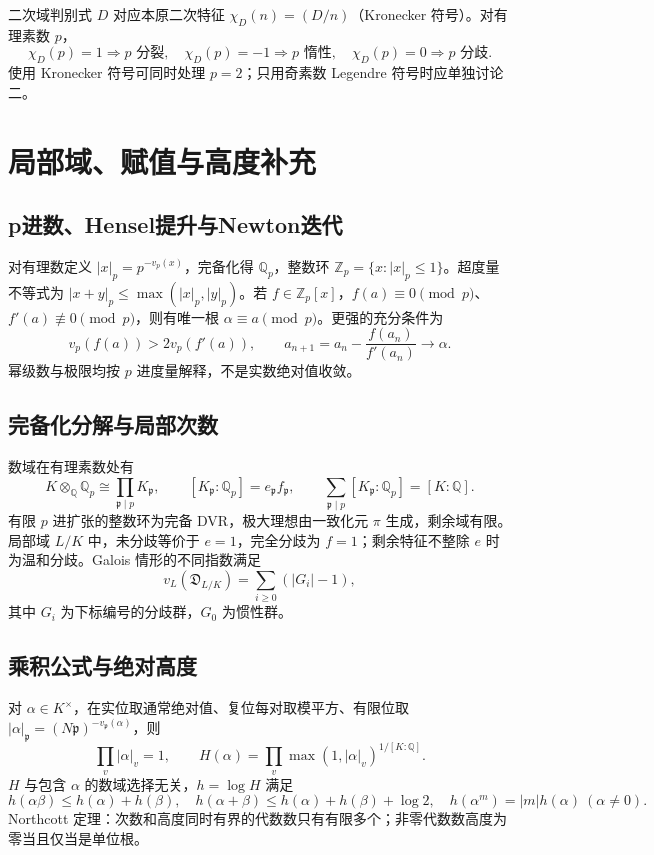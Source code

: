 \documentclass[../main.tex]{subfiles}
\begin{document}
二次域判别式 $D$ 对应本原二次特征 $\chi_D(n)=(D/n)$（Kronecker 符号）。对有理素数 $p$，
\[
\chi_D(p)=1\Rightarrow p\text{ 分裂},\quad
\chi_D(p)=-1\Rightarrow p\text{ 惰性},\quad
\chi_D(p)=0\Rightarrow p\text{ 分歧}.
\]
使用 Kronecker 符号可同时处理 $p=2$；只用奇素数 Legendre 符号时应单独讨论二。
\section{局部域、赋值与高度补充}
\subsection{p进数、Hensel提升与Newton迭代}
对有理数定义 $|x|_p=p^{-v_p(x)}$，完备化得 $\mathbb Q_p$，整数环 $\mathbb Z_p=\{x:|x|_p\le1\}$。超度量不等式为 $|x+y|_p\le\max(|x|_p,|y|_p)$。若 $f\in\mathbb Z_p[x]$，$f(a)\equiv0\pmod p$、$f'(a)\not\equiv0\pmod p$，则有唯一根 $\alpha\equiv a\pmod p$。更强的充分条件为
\[
v_p(f(a))>2v_p(f'(a)),\qquad
a_{n+1}=a_n-\frac{f(a_n)}{f'(a_n)}\longrightarrow\alpha.
\]
幂级数与极限均按 $p$ 进度量解释，不是实数绝对值收敛。
\subsection{完备化分解与局部次数}
数域在有理素数处有
\[
K\otimes_{\mathbb Q}\mathbb Q_p\cong\prod_{\mathfrak p\mid p}K_{\mathfrak p},\qquad
[K_{\mathfrak p}:\mathbb Q_p]=e_{\mathfrak p}f_{\mathfrak p},\qquad
\sum_{\mathfrak p\mid p}[K_{\mathfrak p}:\mathbb Q_p]=[K:\mathbb Q].
\]
有限 $p$ 进扩张的整数环为完备 DVR，极大理想由一致化元 $\pi$ 生成，剩余域有限。局部域 $L/K$ 中，未分歧等价于 $e=1$，完全分歧为 $f=1$；剩余特征不整除 $e$ 时为温和分歧。Galois 情形的不同指数满足
\[
v_L(\mathfrak D_{L/K})=\sum_{i\ge0}(|G_i|-1),
\]
其中 $G_i$ 为下标编号的分歧群，$G_0$ 为惯性群。
\subsection{乘积公式与绝对高度}
对 $\alpha\in K^\times$，在实位取通常绝对值、复位每对取模平方、有限位取 $|\alpha|_{\mathfrak p}=(N\mathfrak p)^{-v_{\mathfrak p}(\alpha)}$，则
\[
\prod_v|\alpha|_v=1,\qquad
H(\alpha)=\prod_v\max(1,|\alpha|_v)^{1/[K:\mathbb Q]}.
\]
$H$ 与包含 $\alpha$ 的数域选择无关，$h=\log H$ 满足
\[
h(\alpha\beta)\le h(\alpha)+h(\beta),\quad
h(\alpha+\beta)\le h(\alpha)+h(\beta)+\log2,\quad
h(\alpha^m)=|m|h(\alpha)\ (\alpha\ne0).
\]
Northcott 定理：次数和高度同时有界的代数数只有有限多个；非零代数数高度为零当且仅当是单位根。
\end{document}
